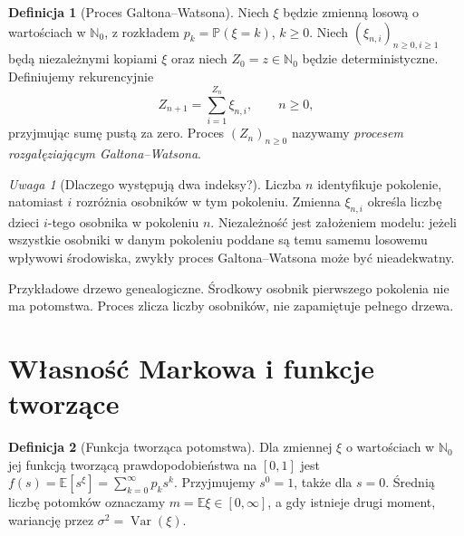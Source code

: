 \documentclass[11pt,a4paper,oneside]{report}
\numberwithin{equation}{chapter}
\theoremstyle{plain}
\theoremstyle{definition}
\newtheorem{definicja}{Definicja}[chapter]
\theoremstyle{remark}
\newtheorem{uwaga}{Uwaga}[chapter]
\newcommand{\N}{\mathbb{N}}
\newcommand{\Prob}{\mathbb{P}}
\newcommand{\E}{\mathbb{E}}
\newcommand{\Var}{\operatorname{Var}}
\begin{document}
\begin{definicja}[Proces Galtona--Watsona]
Niech $\xi$ będzie zmienną losową o wartościach w $\N_0$,
z rozkładem $p_k=\Prob(\xi=k)$, $k\ge0$.
Niech $(\xi_{n,i})_{n\ge0,i\ge1}$ będą niezależnymi kopiami
$\xi$ oraz niech $Z_0=z\in\N_0$ będzie deterministyczne.
Definiujemy rekurencyjnie
\[
Z_{n+1}=\sum_{i=1}^{Z_n}\xi_{n,i},\qquad n\ge0,
\]
przyjmując sumę pustą za zero. Proces $(Z_n)_{n\ge0}$
nazywamy \emph{procesem rozgałęziającym Galtona--Watsona}.
\end{definicja}

\begin{uwaga}[Dlaczego występują dwa indeksy?]
Liczba $n$ identyfikuje pokolenie, natomiast $i$ rozróżnia
osobników w tym pokoleniu. Zmienna $\xi_{n,i}$ określa liczbę
dzieci $i$-tego osobnika w pokoleniu $n$. Niezależność jest
założeniem modelu: jeżeli wszystkie osobniki w danym pokoleniu
poddane są temu samemu losowemu wpływowi środowiska, zwykły
proces Galtona--Watsona może być nieadekwatny.
\end{uwaga}

\begin{center}
\par\smallskip\small Przykładowe drzewo genealogiczne.
Środkowy osobnik pierwszego pokolenia nie ma potomstwa.
Proces zlicza liczby osobników, nie zapamiętuje pełnego drzewa.
\end{center}

\section{Własność Markowa i funkcje tworzące}
\begin{definicja}[Funkcja tworząca potomstwa]
Dla zmiennej $\xi$ o wartościach w $\N_0$ jej funkcją tworzącą
prawdopodobieństwa na $[0,1]$ jest
$f(s)=\E[s^\xi]=\sum_{k=0}^\infty p_ks^k$.
Przyjmujemy $s^0=1$, także dla $s=0$.
Średnią liczbę potomków oznaczamy
$m=\E\xi\in[0,\infty]$, a gdy istnieje drugi moment,
wariancję przez $\sigma^2=\Var(\xi)$.
\end{definicja}
\end{document}
